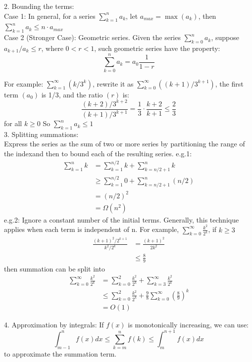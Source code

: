 \documentclass{article}
\begin{document}
2. Bounding the terms:\\
Case 1: In general, for a series $\sum_{k=1}^n a_k$, let $a_{max} = \max(a_k)$, then $\sum_{k=1}^n a_k \leq n\cdot a_{max}$ \\
Case 2 (Stronger Case): Geometric series. Given the series $\sum_{k=0}^n a_k$, suppose $a_{k+1}/a_k \leq r$, where  $0 < r < 1$, such geometric series have the property: \[ \sum_{k=0}^n a_k = a_0 \frac{1}{1-r}\]

For example: $\sum_{k =1}^\infty (k/3^k)$, rewrite it as $\sum_{k = 0}^\infty ((k+1)/3^{k+1})$, the first term $(a_0)$ is 1/3, and the ratio $(r)$ is: 
\[ \frac{(k+2)/3^{k+2}}{(k+1)/3^{k+1}} = \frac{1}{3}\cdot \frac{k+2}{k+1} \leq \frac{2}{3}\] for all $k \geq 0$  
So $\sum_{k=1}^n a_k \leq 1$ \\

3. Splitting summations:\\
Express the series as the sum of two or more series by partitioning the range of the indexand then to bound each of the resulting series. 
e.g.1:\begin{align*}
    \sum_{k=1}^{n} k &=\sum_{k=1}^{n / 2} k+\sum_{k=n / 2+1}^{n} k \\
    & \geq \sum_{k=1}^{n / 2} 0+\sum_{k=n / 2+1}^{n}(n / 2) \\
    &=(n / 2)^{2} \\
    &=\Omega\left(n^{2}\right)
    \end{align*}
e.g.2: Ignore a constant number of the initial terms. Generally, this technique applies when each term is independent of n.
For example, $\sum_{k=0}^{\infty} \frac{k^{2}}{2^{k}}$, if $k \geq 3$
\begin{align*}
    \frac{(k+1)^{2} / 2^{k+1}}{k^{2} / 2^{k}} &=\frac{(k+1)^{2}}{2 k^{2}} \\
    & \leq \frac{8}{9}
\end{align*}
then summation can be split into
\begin{align*}
    \sum_{k=0}^{\infty} \frac{k^{2}}{2^{k}} &=\sum_{k=0}^{2} \frac{k^{2}}{2^{k}}+\sum_{k=3}^{\infty} \frac{k^{2}}{2^{k}} \\
    & \leq \sum_{k=0}^{2} \frac{k^{2}}{2^{k}}+\frac{9}{8} \sum_{k=0}^{\infty}\left(\frac{8}{9}\right)^{k} \\
    &=O(1)
\end{align*}

4. Approximation by integrals: If $f(x)$ is monotonically increasing, we can use:
\[\int_{m-1}^n f(x) dx\leq \sum_{k=m}^n f(k) \leq\int_{m}^{n+1} f(x)dx\] to approximate the summation term. 
\end{document}
